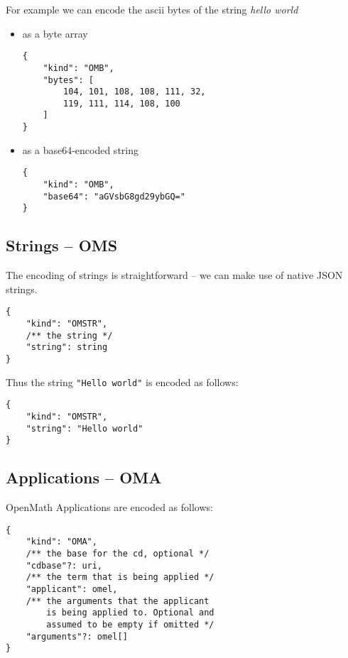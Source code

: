 For example we can encode the ascii bytes of the string \textit{hello world}
\begin{itemize}
    \item as a byte array
      \\\begin{minipage}{\linewidth}
\begin{lstlisting}
{
    "kind": "OMB",
    "bytes": [
        104, 101, 108, 108, 111, 32, 
        119, 111, 114, 108, 100
    ]
}
\end{lstlisting}\end{minipage}
    \item as a base64-encoded string
\\\begin{minipage}{\linewidth}
\begin{lstlisting}
{
    "kind": "OMB",
    "base64": "aGVsbG8gd29ybGQ="
}
\end{lstlisting}\end{minipage}
\end{itemize}

\subsection{Strings -- OMS}
The encoding of strings is straightforward -- we can make use of native JSON strings. 
\\\begin{minipage}{\linewidth}
\begin{lstlisting}
{
    "kind": "OMSTR", 
    /** the string */
    "string": string
}
\end{lstlisting}\end{minipage}

Thus the string \lstinline{"Hello world"} is encoded as follows:
\\\begin{minipage}{\linewidth}
\begin{lstlisting}
{
    "kind": "OMSTR", 
    "string": "Hello world"
}
\end{lstlisting}\end{minipage}

\subsection{Applications -- OMA}

OpenMath Applications are encoded as follows:
\\\begin{minipage}{\linewidth}
\begin{lstlisting}
{
    "kind": "OMA", 
    /** the base for the cd, optional */
    "cdbase"?: uri, 
    /** the term that is being applied */
    "applicant": omel, 
    /** the arguments that the applicant 
        is being applied to. Optional and
        assumed to be empty if omitted */
    "arguments"?: omel[]
}
\end{lstlisting}\end{minipage}

